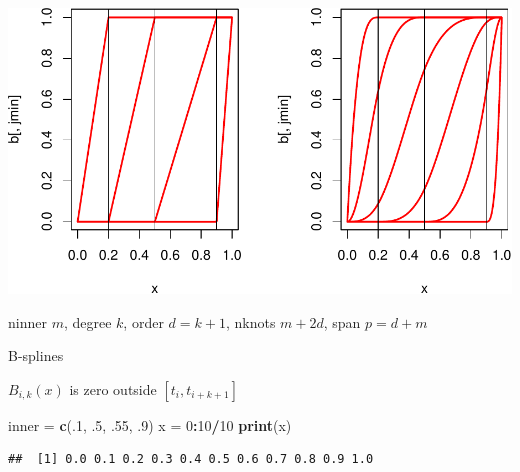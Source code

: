 \documentclass[
  12pt,
]{article}
\newenvironment{Shaded}{\begin{snugshade}}{\end{snugshade}}
\newcommand{\DecValTok}[1]{\textcolor[rgb]{0.00,0.00,0.81}{#1}}
\newcommand{\FunctionTok}[1]{\textcolor[rgb]{0.13,0.29,0.53}{\textbf{#1}}}
\newcommand{\NormalTok}[1]{#1}
\newcommand{\OtherTok}[1]{\textcolor[rgb]{0.56,0.35,0.01}{#1}}
\newcommand{\SpecialCharTok}[1]{\textcolor[rgb]{0.81,0.36,0.00}{\textbf{#1}}}
\begin{document}
\includegraphics{smacofManual_files/figure-latex/bsplinesord-1.pdf}

ninner \(m\), degree \(k\), order \(d=k+1\), nknots \(m + 2d\), span \(p=d+m\)

B-splines

\(B_{i,k}(x)\) is zero outside \([t_i,t_{i+k+1}]\)

\begin{Shaded}
\begin{Highlighting}[]
\NormalTok{inner }\OtherTok{=} \FunctionTok{c}\NormalTok{(.}\DecValTok{1}\NormalTok{, .}\DecValTok{5}\NormalTok{, .}\DecValTok{55}\NormalTok{, .}\DecValTok{9}\NormalTok{)}
\NormalTok{x }\OtherTok{=} \DecValTok{0}\SpecialCharTok{:}\DecValTok{10}\SpecialCharTok{/}\DecValTok{10}
\FunctionTok{print}\NormalTok{(x)}
\end{Highlighting}
\end{Shaded}

\begin{verbatim}
##  [1] 0.0 0.1 0.2 0.3 0.4 0.5 0.6 0.7 0.8 0.9 1.0
\end{verbatim}
\end{document}
